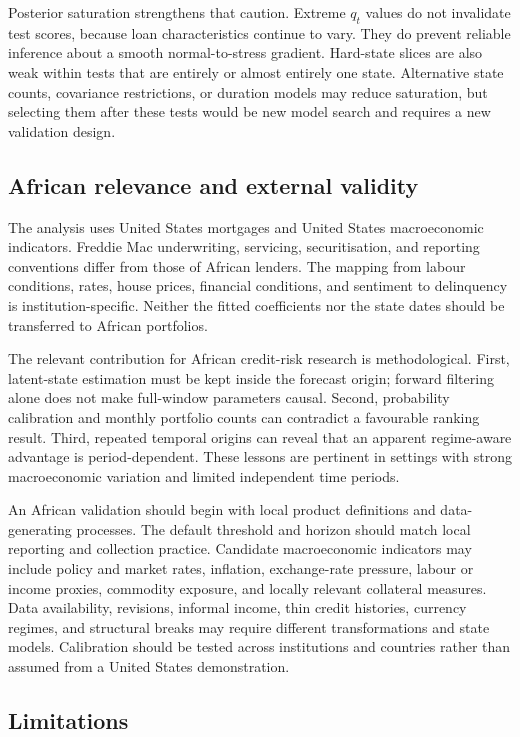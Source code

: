 \documentclass[12pt]{article}
\begin{document}
Posterior saturation strengthens that caution. Extreme $q_t$ values do not invalidate test scores, because loan characteristics continue to vary. They do prevent reliable inference about a smooth normal-to-stress gradient. Hard-state slices are also weak within tests that are entirely or almost entirely one state. Alternative state counts, covariance restrictions, or duration models may reduce saturation, but selecting them after these tests would be new model search and requires a new validation design.

\subsection{African relevance and external validity}

The analysis uses United States mortgages and United States macroeconomic indicators. Freddie Mac underwriting, servicing, securitisation, and reporting conventions differ from those of African lenders. The mapping from labour conditions, rates, house prices, financial conditions, and sentiment to delinquency is institution-specific. Neither the fitted coefficients nor the state dates should be transferred to African portfolios.

The relevant contribution for African credit-risk research is methodological. First, latent-state estimation must be kept inside the forecast origin; forward filtering alone does not make full-window parameters causal. Second, probability calibration and monthly portfolio counts can contradict a favourable ranking result. Third, repeated temporal origins can reveal that an apparent regime-aware advantage is period-dependent. These lessons are pertinent in settings with strong macroeconomic variation and limited independent time periods.

An African validation should begin with local product definitions and data-generating processes. The default threshold and horizon should match local reporting and collection practice. Candidate macroeconomic indicators may include policy and market rates, inflation, exchange-rate pressure, labour or income proxies, commodity exposure, and locally relevant collateral measures. Data availability, revisions, informal income, thin credit histories, currency regimes, and structural breaks may require different transformations and state models. Calibration should be tested across institutions and countries rather than assumed from a United States demonstration.

\subsection{Limitations}
\end{document}
